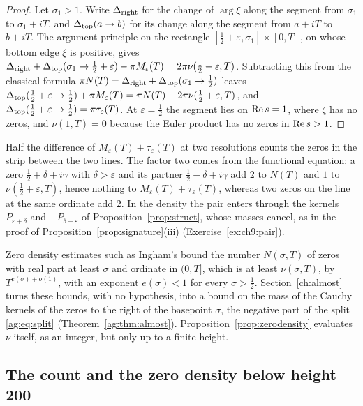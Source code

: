 \begin{proof}
Let $\sigma_1>1$. Write $\Delta_{\rm right}$ for the change of $\arg\xi$ along the segment from $\sigma_1$ to $\sigma_1+iT$, and $\Delta_{\rm top}(a\to b)$ for its change along the segment from $a+iT$ to $b+iT$. The argument principle on the rectangle $[\tfrac12+\varepsilon,\sigma_1]\times[0,T]$, on whose bottom edge $\xi$ is positive, gives $\Delta_{\rm right}+\Delta_{\rm top}(\sigma_1\to\tfrac12+\varepsilon)-\pi M_\varepsilon(T)=2\pi\nu(\tfrac12+\varepsilon,T)$. Subtracting this from the classical formula $\pi N(T)=\Delta_{\rm right}+\Delta_{\rm top}(\sigma_1\to\tfrac12)$ \cite[Section 9.3]{Titchmarsh} leaves $\Delta_{\rm top}(\tfrac12+\varepsilon\to\tfrac12)+\pi M_\varepsilon(T)=\pi N(T)-2\pi\nu(\tfrac12+\varepsilon,T)$, and $\Delta_{\rm top}(\tfrac12+\varepsilon\to\tfrac12)=\pi\tau_\varepsilon(T)$. At $\varepsilon=\tfrac12$ the segment lies on $\operatorname{Re} s=1$, where $\zeta$ has no zeros, and $\nu(1,T)=0$ because the Euler product has no zeros in $\operatorname{Re} s>1$.
\end{proof}

Half the difference of $M_\varepsilon(T)+\tau_\varepsilon(T)$ at two resolutions counts the zeros in the strip between the two lines. The factor two comes from the functional equation: a zero $\tfrac12+\delta+i\gamma$ with $\delta>\varepsilon$ and its partner $\tfrac12-\delta+i\gamma$ add $2$ to $N(T)$ and $1$ to $\nu(\tfrac12+\varepsilon,T)$, hence nothing to $M_\varepsilon(T)+\tau_\varepsilon(T)$, whereas two zeros on the line at the same ordinate add $2$. In the density the pair enters through the kernels $P_{\varepsilon+\delta}$ and $-P_{\delta-\varepsilon}$ of Proposition~\ref{prop:struct}, whose masses cancel, as in the proof of Proposition~\ref{prop:signature}(iii) (Exercise~\ref{ex:ch9:pair}).

Zero density estimates such as Ingham's \cite{Ingham40} bound the number $N(\sigma,T)$ of zeros with real part at least $\sigma$ and ordinate in $(0,T]$, which is at least $\nu(\sigma,T)$, by $T^{e(\sigma)+o(1)}$, with an exponent $e(\sigma)<1$ for every $\sigma>\tfrac12$. Section~\ref{ch:almost} turns these bounds, with no hypothesis, into a bound on the mass of the Cauchy kernels of the zeros to the right of the basepoint $\sigma$, the negative part of the split \eqref{ag:eq:split} (Theorem~\ref{ag:thm:almost}). Proposition~\ref{prop:zerodensity} evaluates $\nu$ itself, as an integer, but only up to a finite height.

\subsection{The count and the zero density below height 200}\label{sec:ch9:count}

